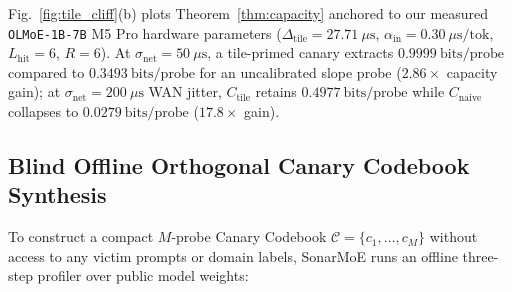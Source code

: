 \documentclass[11pt,a4paper]{article}
\renewcommand{\_}{\textunderscore\allowbreak}
\def\SM{SonarMoE}%
\theoremstyle{definition}
\theoremstyle{remark}
\newcommand{\SM}{\textsc{SonarMoE}}
\begin{document}
Fig.~\ref{fig:tile_cliff}(b) plots Theorem~\ref{thm:capacity} anchored to our measured \texttt{OLMoE-1B-7B} M5 Pro hardware parameters ($\Delta_{\mathrm{tile}} = 27.71~\mu\mathrm{s}$, $\alpha_{\mathrm{in}} = 0.30~\mu\mathrm{s}/\text{tok}$, $L_{\mathrm{hit}} = 6$, $R = 6$). At $\sigma_{\mathrm{net}} = 50~\mu\mathrm{s}$, a tile-primed canary extracts $0.9999~\mathrm{bits/probe}$ compared to $0.3493~\mathrm{bits/probe}$ for an uncalibrated slope probe ($2.86\times$ capacity gain); at $\sigma_{\mathrm{net}} = 200~\mu\mathrm{s}$ WAN jitter, $C_{\mathrm{tile}}$ retains $0.4977~\mathrm{bits/probe}$ while $C_{\mathrm{naive}}$ collapses to $0.0279~\mathrm{bits/probe}$ ($17.8\times$ gain).

\subsection{Blind Offline Orthogonal Canary Codebook Synthesis}
To construct a compact $M$-probe Canary Codebook $\mathcal{C} = \{c_1, \dots, c_M\}$ without access to any victim prompts or domain labels, \SM{} runs an offline three-step profiler over public model weights:
\end{document}
